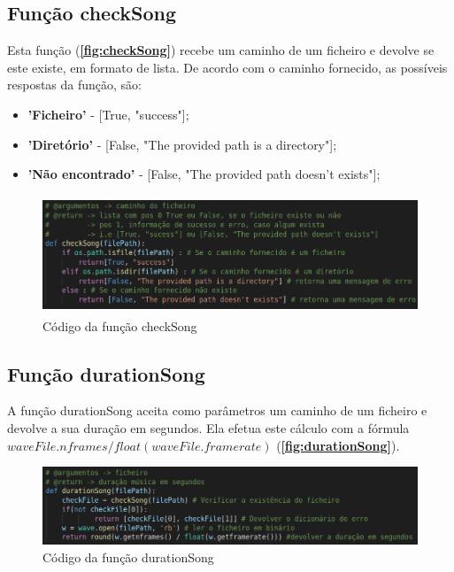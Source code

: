 \documentclass{report}
\begin{document}
\subsection{Função checkSong}
\label{ssec:checkSong}
Esta função (\textbf{\autoref{fig:checkSong}}) recebe um caminho de um ficheiro e devolve se este existe, em formato de lista. De acordo com o caminho fornecido, 
as possíveis respostas da função, são:
\begin{itemize}
    \item \textbf{'Ficheiro'} - [True, "success"];
    \item \textbf{'Diretório'} - [False, "The provided path is a directory"];
    \item \textbf{'Não encontrado'} - [False, "The provided path doesn't exists"];
\end{itemize}

\begin{figure}[!h]
\center 
\includegraphics[height=100pt]{img/checkSong.png}
\caption{Código da função checkSong}
\label{fig:checkSong}
\end{figure}

\subsection{Função durationSong}
\label{ssec:durationSong}
A função durationSong aceita como parâmetros um caminho de um ficheiro e devolve a sua duração em segundos. Ela efetua este
cálculo com a fórmula \(waveFile.nframes / float(waveFile.framerate)\) (\textbf{\autoref{fig:durationSong}}).

\begin{figure}[!h]
\center 
\includegraphics[width=330pt]{img/durationSong.png}
\caption{Código da função durationSong}
\label{fig:durationSong}
\end{figure}
\end{document}
